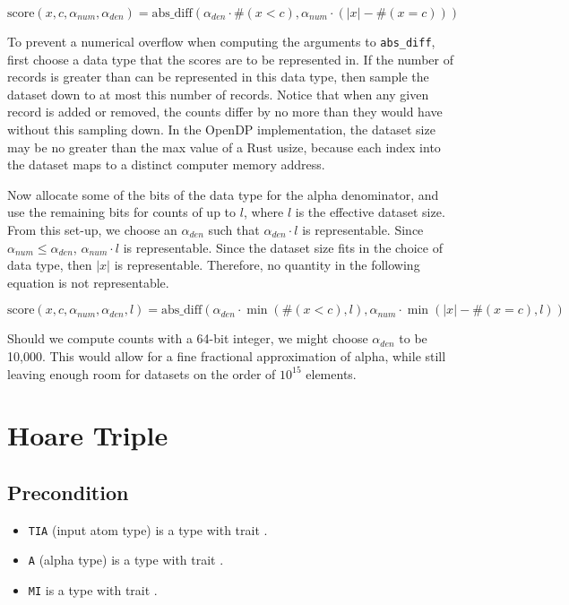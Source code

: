 \documentclass{article}
\begin{document}
\begin{equation}
    \textrm{score}(x, c, \alpha_{num}, \alpha_{den}) = \mathrm{abs\_diff}(\alpha_{den} \cdot \#(x < c), \alpha_{num} \cdot (|x| - \#(x = c)))
\end{equation}

To prevent a numerical overflow when computing the arguments to \texttt{abs\_diff}, 
first choose a data type that the scores are to be represented in.
If the number of records is greater than can be represented in this data type, 
then sample the dataset down to at most this number of records.
Notice that when any given record is added or removed, 
the counts differ by no more than they would have without this sampling down.
In the OpenDP implementation, the dataset size may be no greater than the max value of a Rust usize, 
because each index into the dataset maps to a distinct computer memory address.

Now allocate some of the bits of the data type for the alpha denominator,
and use the remaining bits for counts of up to $l$, where $l$ is the effective dataset size.
From this set-up, we choose an $\alpha_{den}$ such that $\alpha_{den} \cdot l$ is representable.
Since $\alpha_{num} \le \alpha_{den}$, $\alpha_{num} \cdot l$ is representable.
Since the dataset size fits in the choice of data type, then $|x|$ is representable.
Therefore, no quantity in the following equation is not representable.

\begin{equation}
    \textrm{score}(x, c, \alpha_{num}, \alpha_{den}, l) = \mathrm{abs\_diff}(\alpha_{den} \cdot \min(\#(x < c), l), \alpha_{num} \cdot \min(|x| - \#(x = c), l))
\end{equation}

Should we compute counts with a 64-bit integer, we might choose $\alpha_{den}$ to be 10,000.
This would allow for a fine fractional approximation of alpha,
while still leaving enough room for datasets on the order of $10^{15}$ elements.

\section{Hoare Triple}
\subsection*{Precondition}
\begin{itemize}
    \item \texttt{TIA} (input atom type) is a type with trait .
    \item \texttt{A} (alpha type) is a type with trait .
    \item \texttt{MI} is a type with trait .
\end{itemize}
\end{document}

